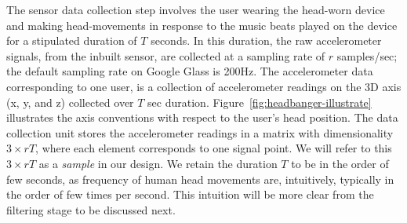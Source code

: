 The sensor data collection step involves the user wearing
the head-worn device and making head-movements in response to
the music beats played on the device for a stipulated duration of $T$ seconds.
In this duration, the raw accelerometer
signals, from the inbuilt sensor, are collected at
a sampling rate of $r$ samples/sec; the default sampling rate on
Google Glass is 200Hz. The accelerometer data corresponding to one user,  is a 
collection of accelerometer readings on the
3D axis (x, y, and z) collected over $T$ sec duration. 
Figure~\ref{fig:headbanger-illustrate} illustrates the axis 
conventions with respect to the user's head position. 
The data collection unit stores the accelerometer readings in a
matrix with dimensionality $3\times rT$, where each element corresponds
to one signal point. We will refer to this $3\times rT$ as a {\em sample} in 
our design. 
We retain the duration $T$ to be in the order of few seconds, as frequency of 
human head movements are, intuitively, typically in the order of few times per 
second. This intuition will be more clear from the filtering stage to be 
discussed next.

